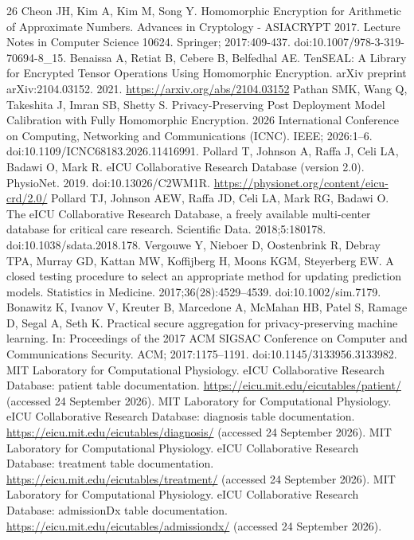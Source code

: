 \documentclass[11pt]{article}
\begin{document}
\begin{thebibliography}{26}
 Cheon JH, Kim A, Kim M, Song Y. Homomorphic Encryption for Arithmetic of Approximate Numbers. Advances in Cryptology - ASIACRYPT 2017. Lecture Notes in Computer Science 10624. Springer; 2017:409-437. doi:10.1007/978-3-319-70694-8\_15.
 Benaissa A, Retiat B, Cebere B, Belfedhal AE. TenSEAL: A Library for Encrypted Tensor Operations Using Homomorphic Encryption. arXiv preprint arXiv:2104.03152. 2021. \url{https://arxiv.org/abs/2104.03152}
 Pathan SMK, Wang Q, Takeshita J, Imran SB, Shetty S. Privacy-Preserving Post Deployment Model Calibration with Fully Homomorphic Encryption. 2026 International Conference on Computing, Networking and Communications (ICNC). IEEE; 2026:1--6. doi:10.1109/ICNC68183.2026.11416991.
 Pollard T, Johnson A, Raffa J, Celi LA, Badawi O, Mark R. eICU Collaborative Research Database (version 2.0). PhysioNet. 2019. doi:10.13026/C2WM1R. \url{https://physionet.org/content/eicu-crd/2.0/}
 Pollard TJ, Johnson AEW, Raffa JD, Celi LA, Mark RG, Badawi O. The eICU Collaborative Research Database, a freely available multi-center database for critical care research. Scientific Data. 2018;5:180178. doi:10.1038/sdata.2018.178.
 Vergouwe Y, Nieboer D, Oostenbrink R, Debray TPA, Murray GD, Kattan MW, Koffijberg H, Moons KGM, Steyerberg EW. A closed testing procedure to select an appropriate method for updating prediction models. Statistics in Medicine. 2017;36(28):4529--4539. doi:10.1002/sim.7179.
 Bonawitz K, Ivanov V, Kreuter B, Marcedone A, McMahan HB, Patel S, Ramage D, Segal A, Seth K. Practical secure aggregation for privacy-preserving machine learning. In: Proceedings of the 2017 ACM SIGSAC Conference on Computer and Communications Security. ACM; 2017:1175--1191. doi:10.1145/3133956.3133982.
 MIT Laboratory for Computational Physiology. eICU Collaborative Research Database: patient table documentation. \url{https://eicu.mit.edu/eicutables/patient/} (accessed 24 September 2026).
 MIT Laboratory for Computational Physiology. eICU Collaborative Research Database: diagnosis table documentation. \url{https://eicu.mit.edu/eicutables/diagnosis/} (accessed 24 September 2026).
 MIT Laboratory for Computational Physiology. eICU Collaborative Research Database: treatment table documentation. \url{https://eicu.mit.edu/eicutables/treatment/} (accessed 24 September 2026).
 MIT Laboratory for Computational Physiology. eICU Collaborative Research Database: admissionDx table documentation. \url{https://eicu.mit.edu/eicutables/admissiondx/} (accessed 24 September 2026).

\end{thebibliography}
\end{document}

